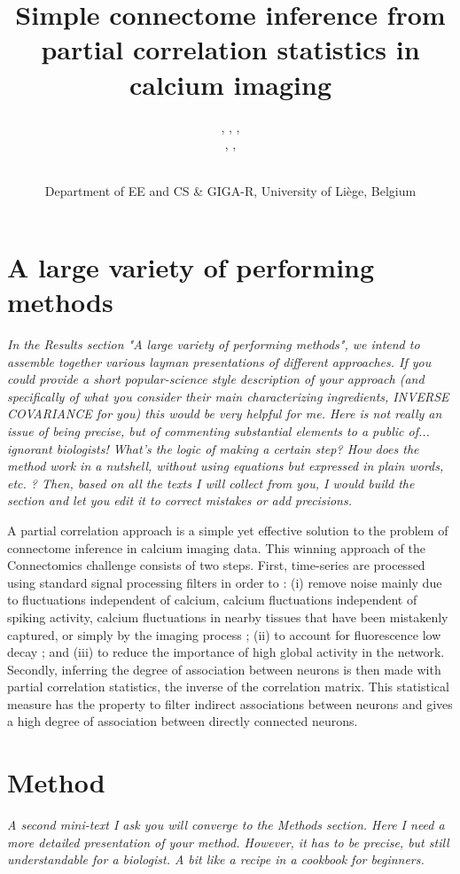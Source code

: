 \documentclass[wcp]{jmlr}
\title{Simple connectome inference from partial correlation statistics in calcium imaging}
\author{\Name{Antonio Sutera},
   \Name{Arnaud Joly},
   \Name{Vincent François-Lavet}, \Email{a.sutera@ulg.ac.be}\\
   \Name{Zixiao Aaron Qiu},
   \Name{Gilles Louppe},
   \Name{Damien Ernst}\and\Name{Pierre Geurts}
    \\
   \addr Department of EE and CS \& GIGA-R, University of Li\`ege, Belgium}
\begin{document}
\section{A large variety of performing methods}

\emph{
In the Results section "A large variety of performing methods", we intend to
assemble together various layman presentations of different approaches. If you
could provide a short popular-science style description of your approach (and
specifically of what you consider their main characterizing ingredients,
INVERSE COVARIANCE for you) this would be very helpful for me.  Here is not
really an issue of being precise, but of commenting substantial elements to a
public of... ignorant biologists! What's the logic of making a certain step?
How does the method work in a nutshell, without using equations but expressed
in plain words, etc. ? Then, based on all the texts I will collect from you, I
would build the section and let you edit it to correct mistakes or add
precisions.\\}


A partial correlation approach \cite{sutera2014simple}  is a simple yet effective
solution to the problem of connectome inference in calcium imaging data.
This winning approach of the Connectomics challenge consists of two steps.
First, time-series are processed using standard
signal processing filters in order to : (i) remove noise mainly due to
fluctuations independent of calcium, calcium fluctuations independent of
spiking activity, calcium fluctuations in nearby tissues that have been
mistakenly captured, or simply by the imaging process ; (ii) to account for
fluorescence low decay ; and (iii) to reduce the importance of high global
activity in the network. Secondly, inferring the degree of association between
neurons is then made with partial correlation statistics, the inverse of the
correlation matrix. This statistical measure has the property to filter
indirect associations between neurons and gives a high degree of association
between directly connected neurons.

\section{Method}
\emph{A second mini-text I ask you will converge to the Methods section. Here I need
a more detailed presentation of your method. However, it has to be precise, but
still understandable for a biologist. A bit like a recipe in a cookbook for
beginners.\\}
\end{document}
